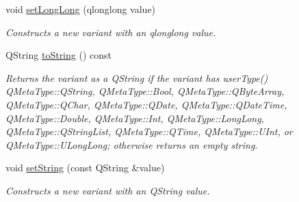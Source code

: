 \begin{DoxyCompactItemize}
\mbox{\label{class_variant_a71259193b1023a8ef4761cc92b4c96b4}} 
void \hyperlink{class_variant_a71259193b1023a8ef4761cc92b4c96b4}{set\+Long\+Long} (qlonglong value)
\begin{DoxyCompactList}\small\item\em Constructs a new variant with an qlonglong value. \end{DoxyCompactList}\item 
\mbox{\label{class_variant_a72d36925a5a47a1138a339cd4c4d3feb}} 
Q\+String \hyperlink{class_variant_a72d36925a5a47a1138a339cd4c4d3feb}{to\+String} () const
\begin{DoxyCompactList}\small\item\em Returns the variant as a Q\+String if the variant has user\+Type() Q\+Meta\+Type\+::\+Q\+String, Q\+Meta\+Type\+::\+Bool, Q\+Meta\+Type\+::\+Q\+Byte\+Array, Q\+Meta\+Type\+::\+Q\+Char, Q\+Meta\+Type\+::\+Q\+Date, Q\+Meta\+Type\+::\+Q\+Date\+Time, Q\+Meta\+Type\+::\+Double, Q\+Meta\+Type\+::\+Int, Q\+Meta\+Type\+::\+Long\+Long, Q\+Meta\+Type\+::\+Q\+String\+List, Q\+Meta\+Type\+::\+Q\+Time, Q\+Meta\+Type\+::\+U\+Int, or Q\+Meta\+Type\+::\+U\+Long\+Long; otherwise returns an empty string. \end{DoxyCompactList}\item 
\mbox{\label{class_variant_a16fb274754b40796aa8341456c53d53c}} 
void \hyperlink{class_variant_a16fb274754b40796aa8341456c53d53c}{set\+String} (const Q\+String \&value)
\begin{DoxyCompactList}\small\item\em Constructs a new variant with an Q\+String value. \end{DoxyCompactList}\end{DoxyCompactItemize}
